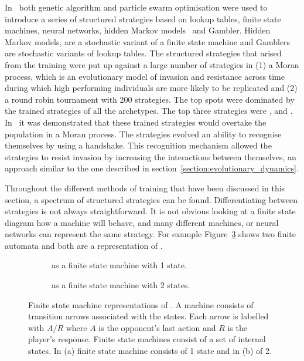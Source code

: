 In~\cite{Knight2017, KnightHGC17} both genetic algorithm and particle swarm
optimisation were used to introduce a series of structured strategies based on
lookup tables, finite state machines, neural networks, hidden Markov
models~\cite{eddy1996} and Gambler. Hidden Markov models, are a stochastic
variant of a finite state machine and Gamblers are stochastic variants of lookup
tables. The structured strategies that arised from the training were put up
against a large number of strategies in (1) a Moran process, which is an
evolutionary model of invasion and resistance across time during which high
performing individuals are more likely to be replicated and (2)
a round robin tournament with 200 strategies. The top spots were dominated by
the trained strategies of all the archetypes. The top three strategies were
\EvolvedLookerUpTwoTwoTwo, \EvolvedHMMFive and \EvolvedFSMSixTeen.
In~\cite{KnightHGC17} it was demonstrated that these trained strategies
would overtake the population in a Moran process. The strategies evolved an ability
to recognise themselves by using a handshake. This recognition mechanism allowed the strategies
to resist invasion by increasing the interactions between themselves, an approach
similar to the one described in section~\ref{section:evolutionary_dynamics}.

Throughout the different methods of training that have been discussed in this
section, a spectrum of structured strategies can be found. Differentiating
between strategies is not always straightforward. It is not obvious looking at a
finite state diagram how a machine will behave, and many different machines, or
neural networks can represent the same strategy. For example
Figure~\ref{fig:machine_tft} shows two finite automata and both are a
representation of \TitForTat.

\begin{figure}[!hbtp]
    \begin{subfigure}{.45\textwidth}\centering
        
        \caption{\TitForTat as a finite state machine with 1 state.}\label{fig:representation_a}
    \end{subfigure} \hfill
    \begin{subfigure}{.45\textwidth}\centering
        
        \caption{\TitForTat as a finite state machine with 2 states.}\label{fig:representation_b}
     \end{subfigure}
     \caption{Finite state machine representations of \TitForTat. A machine
     consists of transition arrows associated with the states. Each arrow is
     labelled with \(A/R\) where \(A\) is the opponent's last action and \(R\)
     is the player's response. Finite state machines consist of a set of
     internal states. In (a) \TitForTat finite state
     machine consists of 1 state and in (b) of 2.}\label{fig:machine_tft}
\end{figure}

